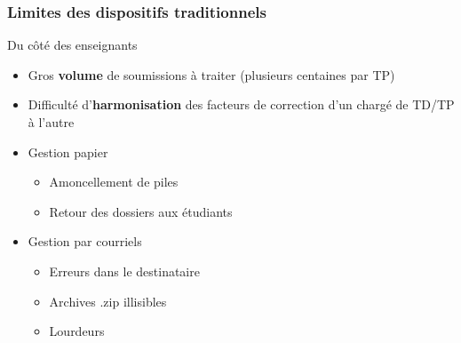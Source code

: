 \documentclass[svgnames,hyperref, english, xcolor=dvipsnames,usenames]{beamer}		        %
\begin{document}
\frame
{
        \frametitle{Limites des dispositifs traditionnels}

        \begin{alertblock}{Du côté des enseignants}
                \begin{itemize}
                        \item Gros \textbf{volume} de soumissions à traiter (plusieurs centaines par TP)
                        \item Difficulté d'\textbf{harmonisation} des facteurs de correction d'un chargé de TD/TP à l'autre
                        \item Gestion papier
                                \begin{itemize}
                                        \item Amoncellement de piles
                                        \item Retour des dossiers aux étudiants
                                \end{itemize}
                        \item Gestion par courriels
                                \begin{itemize}
                                        \item Erreurs dans le destinataire
                                        \item Archives .zip illisibles
                                        \item Lourdeurs
                                \end{itemize}
                \end{itemize}
        \end{alertblock}
}
\end{document}
